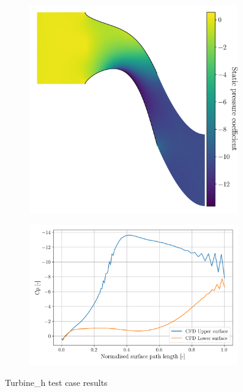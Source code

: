 \documentclass{article}
\begin{document}
\begin{figure}[H]
    \centering
    \begin{subfigure}{0.44\textwidth}
        \centering
        \includegraphics[width=0.99\textwidth]{figures/turbine_h_cp.png}
        \caption{}
        \label{fig:turbine_h_cp}
    \end{subfigure}
    \begin{subfigure}{0.55\textwidth}
        \centering
        \includegraphics[width=0.99\textwidth]{figures/turbine_h_surface_cp_0.0.png}
        \caption{}
        \label{fig:turbine_h_surface_cp}
    \end{subfigure}
    \caption{Turbine\_h test case results}
\end{figure}
\end{document}
